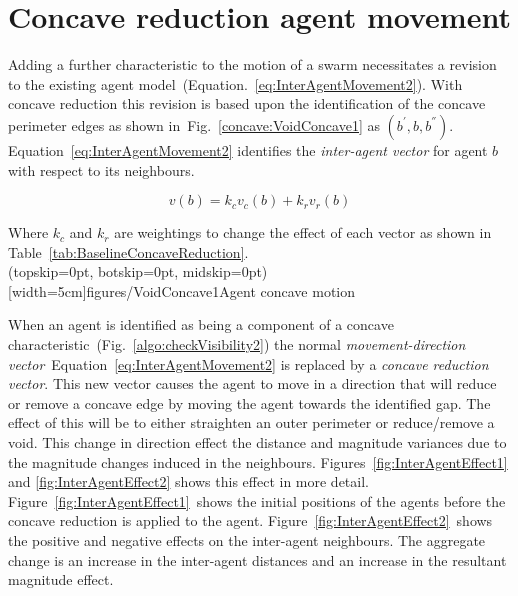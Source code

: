 \documentclass{ieeeaccess}
\begin{document}
\section{Concave reduction agent movement}\label{concave:AgentMovement}
Adding a further characteristic to the motion of a swarm necessitates a revision to the existing agent model~(Equation.~\ref{eq:InterAgentMovement2}). With concave reduction this revision is based upon the identification of the concave perimeter edges as shown in~Fig.~\ref{concave:VoidConcave1} as $(b^{'},b,b^{''})$. 
Equation~\ref{eq:InterAgentMovement2} identifies the \textit{inter-agent vector} for agent $b$ with respect to its neighbours.

\begin{equation}\label{eq:InterAgentMovement2}
v(b) = k_cv_{c}(b) + k_rv_{r}(b)
\end{equation}

Where $k_c$ and $k_r$ are weightings to change the effect of each vector as shown in Table~\ref{tab:BaselineConcaveReduction}.\\

\Figure[t!](topskip=0pt, botskip=0pt, midskip=0pt)[width=5cm]{figures/VoidConcave1}{Agent concave motion\label{concave:VoidConcave1}}

When an agent is identified as being a component of a concave characteristic~(Fig.~\ref{algo:checkVisibility2}) the normal \textit{movement-direction vector}~Equation~\ref{eq:InterAgentMovement2} is replaced by a \textit{concave reduction vector}. This new vector causes the agent to move in a direction that will reduce or remove a concave edge by moving the agent towards the identified gap. The effect of this will be to either straighten an outer perimeter or reduce/remove a void. This change in direction effect the distance and magnitude variances due to the magnitude changes induced in the neighbours. Figures~\ref{fig:InterAgentEffect1} and \ref{fig:InterAgentEffect2} shows this effect in more detail. Figure~\ref{fig:InterAgentEffect1}~shows the initial positions of the agents before the concave reduction is applied to the agent. Figure~\ref{fig:InterAgentEffect2}~shows the positive and negative effects on the inter-agent neighbours. The aggregate change is an increase in the inter-agent distances and an increase in the resultant magnitude effect.
\end{document}
